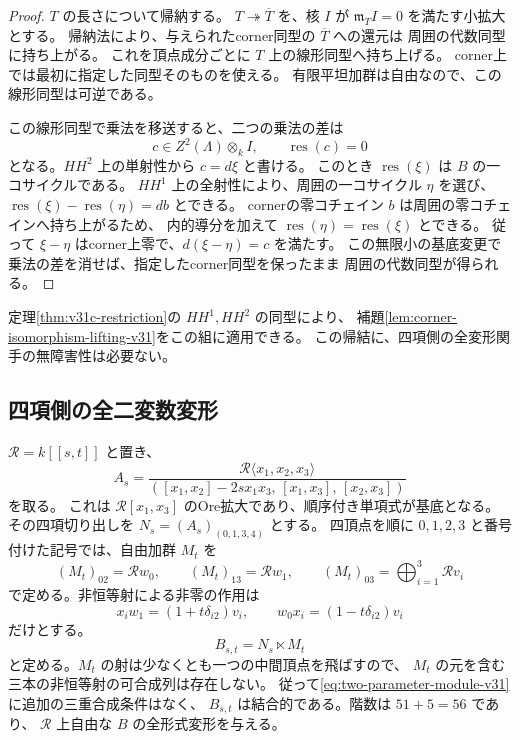 \begin{proof}
$T$ の長さについて帰納する。
$T\twoheadrightarrow \overline T$ を、核 $I$ が
$\mathfrak m_T I=0$ を満たす小拡大とする。
帰納法により、与えられたcorner同型の $\overline T$ への還元は
周囲の代数同型に持ち上がる。
これを頂点成分ごとに $T$ 上の線形同型へ持ち上げる。
corner上では最初に指定した同型そのものを使える。
有限平坦加群は自由なので、この線形同型は可逆である。

この線形同型で乗法を移送すると、二つの乗法の差は
\[
 c\in Z^2(\Lambda)\otimes_k I,
 \qquad \operatorname{res}(c)=0
\]
となる。$HH^2$ 上の単射性から $c=d\xi$ と書ける。
このとき $\operatorname{res}(\xi)$ は $B$ の一コサイクルである。
$HH^1$ 上の全射性により、周囲の一コサイクル $\eta$ を選び、
$\operatorname{res}(\xi)-\operatorname{res}(\eta)=db$ とできる。
cornerの零コチェイン $b$ は周囲の零コチェインへ持ち上がるため、
内的導分を加えて $\operatorname{res}(\eta)=\operatorname{res}(\xi)$ とできる。
従って $\xi-\eta$ はcorner上零で、$d(\xi-\eta)=c$ を満たす。
この無限小の基底変更で乗法の差を消せば、指定したcorner同型を保ったまま
周囲の代数同型が得られる。
\end{proof}

定理\ref{thm:v31c-restriction}の $HH^1,HH^2$ の同型により、
補題\ref{lem:corner-isomorphism-lifting-v31}をこの組に適用できる。
この帰結に、四項側の全変形関手の無障害性は必要ない。

\subsection{四項側の全二変数変形}

$\mathscr R=k[[s,t]]$ と置き、
\[
 A_s=
 \frac{\mathscr R\langle x_1,x_2,x_3\rangle}
 {([x_1,x_2]-2s x_1x_3,\,[x_1,x_3],\,[x_2,x_3])}
\]
を取る。
これは $\mathscr R[x_1,x_3]$ のOre拡大であり、順序付き単項式が基底となる。
その四項切り出しを $N_s=(A_s)_{(0,1,3,4)}$ とする。
四頂点を順に $0,1,2,3$ と番号付けた記号では、自由加群 $M_t$ を
\[
 (M_t)_{02}=\mathscr Rw_0,\qquad
 (M_t)_{13}=\mathscr Rw_1,\qquad
 (M_t)_{03}=\bigoplus_{i=1}^3\mathscr Rv_i
\]
で定める。非恒等射による非零の作用は
\begin{equation}\label{eq:two-parameter-module-v31}
 x_iw_1=(1+t\delta_{i2})v_i,
 \qquad w_0x_i=(1-t\delta_{i2})v_i
\end{equation}
だけとする。
\[
 B_{s,t}=N_s\ltimes M_t
\]
と定める。$M_t$ の射は少なくとも一つの中間頂点を飛ばすので、
$M_t$ の元を含む三本の非恒等射の可合成列は存在しない。
従って\eqref{eq:two-parameter-module-v31}に追加の三重合成条件はなく、
$B_{s,t}$ は結合的である。階数は $51+5=56$ であり、
$\mathscr R$ 上自由な $B$ の全形式変形を与える。

